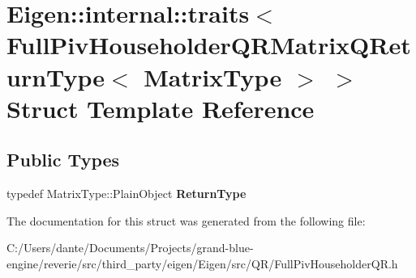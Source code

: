 \hypertarget{struct_eigen_1_1internal_1_1traits_3_01_full_piv_householder_q_r_matrix_q_return_type_3_01_matrix_type_01_4_01_4}{}\section{Eigen\+::internal\+::traits$<$ Full\+Piv\+Householder\+Q\+R\+Matrix\+Q\+Return\+Type$<$ Matrix\+Type $>$ $>$ Struct Template Reference}
\label{struct_eigen_1_1internal_1_1traits_3_01_full_piv_householder_q_r_matrix_q_return_type_3_01_matrix_type_01_4_01_4}
\subsection*{Public Types}
\begin{DoxyCompactItemize}
\item 
\mbox{\label{struct_eigen_1_1internal_1_1traits_3_01_full_piv_householder_q_r_matrix_q_return_type_3_01_matrix_type_01_4_01_4_a1b18d24309d6c761c5b756e76f99f4f9}} 
typedef Matrix\+Type\+::\+Plain\+Object {\bfseries Return\+Type}
\end{DoxyCompactItemize}


The documentation for this struct was generated from the following file\+:\begin{DoxyCompactItemize}
\item 
C\+:/\+Users/dante/\+Documents/\+Projects/grand-\/blue-\/engine/reverie/src/third\+\_\+party/eigen/\+Eigen/src/\+Q\+R/Full\+Piv\+Householder\+Q\+R.\+h\end{DoxyCompactItemize}
